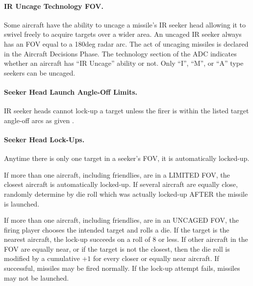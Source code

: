 {\paragraph{IR Uncage Technology FOV.} \label{rule:ir-uncage} Some aircraft have the ability to uncage a missile's IR seeker head allowing it to swivel freely to acquire targets over a wider area. An uncaged IR seeker always has an FOV equal to a 180{deg} radar arc. The act of uncaging missiles is declared in the Aircraft Decisions Phase. The technology section of the ADC indicates whether an aircraft has “IR Uncage” ability or not. Only “I”, “M”, or “A” type seekers can be uncaged.



\paragraph{Seeker Head Launch Angle-Off Limits.} IR seeker heads cannot lock-up a target unless the firer is within the listed target angle-off arcs as given .


\paragraph{Seeker Head Lock-Ups.} Anytime there is only one target in a seeker's FOV, it is automatically locked-up.

If more than one aircraft, including friendlies, are in a LIMITED FOV, the closest aircraft is automatically locked-up. If several aircraft are equally close, randomly determine by die roll which was actually locked-up AFTER the missile is launched.

If more than one aircraft, including friendlies, are in an UNCAGED FOV, the firing player chooses the intended target and rolls a die. If the target is the nearest aircraft, the lock-up succeeds on a roll of 8 or less. If other aircraft in the FOV are equally near, or if the target is not the closest, then the die roll is modified by a cumulative $+1$ for every closer or equally near aircraft. If successful, missiles may be fired normally. If the lock-up attempt fails, missiles may not be launched.

}
